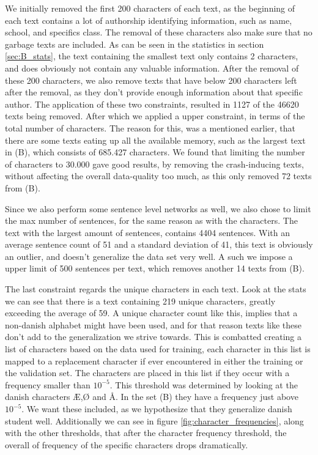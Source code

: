 We initially removed the first 200 characters of each text, as the beginning
of each text contains a lot of authorship identifying information, such as
name, school, and specifics class. The removal of these characters also make
sure that no garbage texts are included. As can be seen in the statistics in
section \ref{sec:B_stats}, the text containing the smallest text only contains
2 characters, and does obviously not contain any valuable information. After
the removal of these 200 characters, we also remove texts that have below 200
characters left after the removal, as they don't provide enough information
about that specific author. The application of these two constraints, resulted
in 1127 of the 46620 texts being removed. After which we applied a upper
constraint, in terms of the total number of characters. The reason for this,
was a mentioned earlier, that there are some texts eating up all the available
memory, such as the largest text in (B), which consists of 685.427 characters.
We found that limiting the number of characters to 30.000 gave good results, by
removing the crash-inducing texts, without affecting the overall data-quality
too much, as this only removed 72 texts from (B).

Since we also perform some sentence level networks as well, we also chose to
limit the max number of sentences, for the same reason as with the characters.
The text with the largest amount of sentences, contains 4404 sentences. With
an average sentence count of 51 and a standard deviation of 41, this text is
obviously an outlier, and doesn't generalize the data set very well. A such we
impose a upper limit of 500 sentences per text, which removes another 14 texts
from (B).

The last constraint regards the unique characters in each text. Look at the
stats we can see that there is a text containing 219 unique characters, greatly
exceeding the average of 59. A unique character count like this, implies that a
non-danish alphabet might have been used, and for that reason texts like these
don't add to the generalization we strive towards. This is combatted creating a
list of characters based on the data used for training, each character in this
list is mapped to a replacement character if ever encountered in either the
training or the validation set. The characters are placed in this list if they
occur with a frequency smaller than $10^{-5}$. This threshold was determined
by looking at the danish characters Æ,Ø and Å. In the set (B) they have
a frequency just above $10^{-5}$. We want these included, as we hypothesize
that they generalize danish student well. Additionally we can see in figure
\ref{fig:character_frequencies}, along with the other thresholds, that after
the character frequency threshold, the overall of frequency of the specific
characters drops dramatically.

